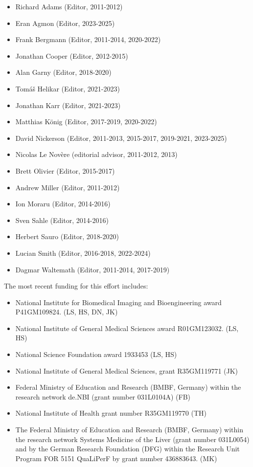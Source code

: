 \documentclass[pdftex,rgb,dvipsnames,svgnames,hyperref,table]{report}
\begin{document}
\begin{itemize}
\item Richard Adams (Editor, 2011-2012)
\item Eran Agmon (Editor, 2023-2025)
\item Frank Bergmann (Editor, 2011-2014, 2020-2022)
\item Jonathan Cooper (Editor, 2012-2015)
\item Alan Garny (Editor, 2018-2020)
\item Tom\'{a}\v{s} Helikar (Editor, 2021-2023)
\item Jonathan Karr (Editor, 2021-2023)
\item Matthias K\"{o}nig (Editor, 2017-2019, 2020-2022)
\item David Nickerson (Editor, 2011-2013, 2015-2017, 2019-2021, 2023-2025)
\item Nicolas Le Nov{\`e}re (editorial advisor, 2011-2012, 2013)
\item Brett Olivier (Editor, 2015-2017)
\item Andrew Miller (Editor, 2011-2012)
\item Ion Moraru (Editor, 2014-2016)
\item Sven Sahle (Editor, 2014-2016)
\item Herbert Sauro (Editor, 2018-2020)
\item Lucian Smith (Editor, 2016-2018, 2022-2024)
\item Dagmar Waltemath (Editor, 2011-2014, 2017-2019)
\end{itemize}

The most recent funding for this effort includes:
\begin{itemize}
\item{National Institute for Biomedical Imaging and Bioengineering award P41GM109824. (LS, HS, DN, JK)}
\item{National Institute of General Medical Sciences award R01GM123032. (LS, HS)}
\item{National Science Foundation award 1933453 (LS, HS)}
\item{National Institute of General Medical Sciences, grant R35GM119771 (JK)}
\item{Federal Ministry of Education and Research (BMBF, Germany) within the research network de.NBI (grant number 031L0104A) (FB)}
\item{National Institute of Health grant number R35GM119770 (TH)}
\item{The Federal Ministry of Education and Research (BMBF, Germany) within the research network Systems Medicine of the Liver (grant number 031L0054) and by the German Research Foundation (DFG) within the Research Unit Program FOR 5151 QuaLiPerF by grant number 436883643. (MK)}
\end{itemize}
\end{document}
